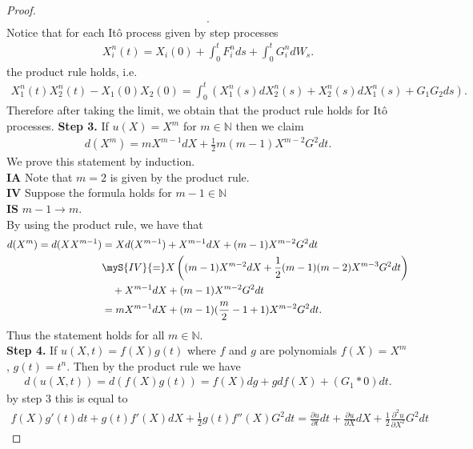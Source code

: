 \begin{proof}
\begin{align*}
  .\end{align*}
  Notice that for each It\^o process given by step processes 
  \begin{align*}
    X_i^{n}(t) = X_i(0) + \int_0^{t} F_i^{n} ds + \int_0^{t} G_i^{n} dW_s     
  .\end{align*}
  the product rule holds, i.e. 
  \begin{align*}
    X_1^{n}(t)X_2^{n}(t) - X_1(0)X_2(0) = \int_0^{t} \left( X_1^{n}(s)dX_2^{n}(s) + X_2^{n}(s) dX_1^{n}(s) + G_{1}G_{2}ds     \right)    
  .\end{align*}
  Therefore after taking the limit, we obtain that the product rule holds for It\^o processes.
  \vskip2mm
  \textbf{Step 3.} If $u(X) = X^{m} $ for $m \in  \mathbb{N}$ then we claim 
  \begin{align*}
    d(X^{m} ) = mX^{m-1}dX + \frac{1}{2}m(m-1) X^{m-2} G^2dt
  .\end{align*}
  We prove this statement by induction.\\
  \textbf{IA} Note that $m=2$ is given by the product rule. \\
  \textbf{IV} Suppose the formula holds for $m-1 \in  \mathbb{N}$ \\
  \textbf{IS} $m-1 \to m$.\\
  By using the product rule, we have that 
  \begin{align*}
    d(X^{m} )= d(XX^{m-1} ) &= Xd(X^{m-1} ) + X^{m-1}dX + (m-1)X^{m-2} G^2dt \\
                            &\myS{IV}{=} X \left( (m-1)X^{m-2} dX + \frac{1}{2}(m-1)(m-2)X^{m-3}G^2 dt   \right) \\
                            & \quad + X^{m-1}dX + (m-1)X^{m-2}G^2 dt \\
                            &= mX^{m-1} dX + (m-1)(\frac{m}{2} -1 +1) X^{m-2} G^2 dt 
  .\end{align*}
  Thus the statement holds for all $m \in  \mathbb{N}$.\\
  \vskip3mm
  \textbf{Step 4.} If $u(X,t) = f(X)g(t)$ where $f$ and $g$ are polynomials $f(X) = X^{m} $ , $g(t) =t^n$.
  Then by the product rule we have 
  \begin{align*}
    d(u(X,t)) = d(f(X)g(t)) = f(X)dg + g df(X) + (G_{1}*0) dt
  .\end{align*}
  by step 3  this is equal to
  \begin{align*}
    f(X)g'(t)dt + g(t)f'(X)dX + \frac{1}{2}g(t)f''(X)G^2 dt =\frac{\partial u}{\partial t} dt + \frac{\partial u}{\partial X} dX + \frac{1}{2} \frac{\partial ^2 u}{\partial X^2} G^2 dt

\end{align*}
\end{proof}
